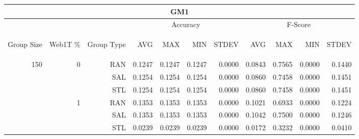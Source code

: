 \begin{center}
\begin{table}[htbp]
\begin{tabular}{ | r | r | r | r | r | r | r | r | r | r | r |}
\hline
\multicolumn{11}{|c|}{GM1}\\
\hline
 & & & \multicolumn{4}{|c|}{Accuracy} & \multicolumn{4}{|c|}{F-Score}\\ \cline{4-11}
\begin{sideways}Group Size\end{sideways} & \begin{sideways}Web1T \%\end{sideways} & \begin{sideways}Group Type\end{sideways} & \begin{sideways}AVG\end{sideways} & \begin{sideways}MAX\end{sideways} & \begin{sideways}MIN\end{sideways} & \begin{sideways}STDEV\end{sideways} & \begin{sideways}AVG\end{sideways} & \begin{sideways}MAX\end{sideways} & \begin{sideways}MIN\end{sideways} & \begin{sideways}STDEV\end{sideways}\\
\hline
\multirow{18}{*}{150}
 & \multirow{3}{*}{0} & RAN & 0.1247 & 0.1247 & 0.1247 & 0.0000 & 0.0843 & 0.7565 & 0.0000 & 0.1440\\ \cline{3-11}
 &   & SAL & 0.1254 & 0.1254 & 0.1254 & 0.0000 & 0.0860 & 0.7458 & 0.0000 & 0.1451\\ \cline{3-11}
 &   & STL & 0.1254 & 0.1254 & 0.1254 & 0.0000 & 0.0860 & 0.7458 & 0.0000 & 0.1451\\ \cline{2-11}
 & \multirow{3}{*}{1} & RAN & 0.1353 & 0.1353 & 0.1353 & 0.0000 & 0.1021 & 0.6933 & 0.0000 & 0.1224\\ \cline{3-11}
 &   & SAL & 0.1353 & 0.1353 & 0.1353 & 0.0000 & 0.1042 & 0.7500 & 0.0000 & 0.1246\\ \cline{3-11}
 &   & STL & 0.0239 & 0.0239 & 0.0239 & 0.0000 & 0.0172 & 0.3232 & 0.0000 & 0.0410\\ \cline{2-11}

\end{tabular}
\end{table}
\end{center}
